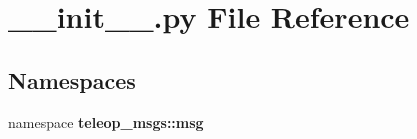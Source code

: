 \section{\_\-\_\-init\_\-\_\-.py File Reference}
\label{msg_2____init_____8py}
\subsection*{Namespaces}
\begin{DoxyCompactItemize}
\item 
namespace {\bf teleop\_\-msgs::msg}
\end{DoxyCompactItemize}
